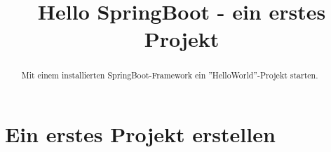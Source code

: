 \documentclass[10pt]{scrartcl}
\title{Hello SpringBoot - ein erstes Projekt}
\begin{document}
	\setlength{\droptitle}{-40pt} %
	\maketitle
	
	
	
	
	
	
	\setcounter{page}{1}
	



\begin{abstract}
 Mit einem installierten SpringBoot-Framework  ein ''HelloWorld''-Projekt starten.	
\end{abstract}

\section{Ein erstes Projekt erstellen}
\end{document}
